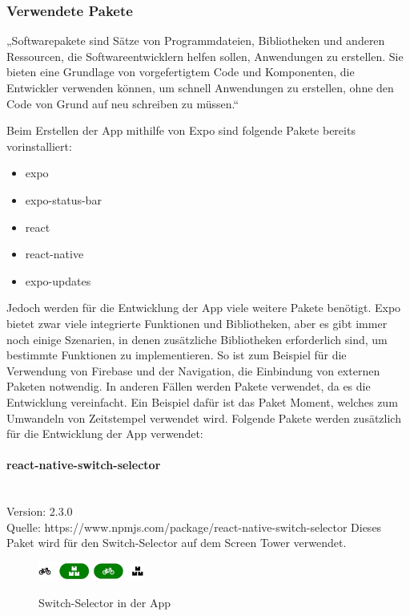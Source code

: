 \subsubsection{Verwendete Pakete}
„Softwarepakete sind Sätze von Programmdateien, Bibliotheken und anderen Ressourcen, die Softwareentwicklern helfen sollen, Anwendungen zu erstellen. Sie bieten eine Grundlage von vorgefertigtem Code und Komponenten, die Entwickler verwenden können, um schnell Anwendungen zu erstellen, ohne den Code von Grund auf neu schreiben zu müssen.“ 

\bigskip


Beim Erstellen der App mithilfe von Expo sind folgende Pakete bereits vorinstalliert:
\begin{itemize}
  \item expo
  \item expo-status-bar
  \item react
  \item react-native
  \item expo-updates
\end{itemize}

\noindent Jedoch werden für die Entwicklung der App viele weitere Pakete benötigt. Expo bietet zwar viele integrierte Funktionen und Bibliotheken, aber es gibt immer noch einige Szenarien, in denen zusätzliche Bibliotheken erforderlich sind, um bestimmte Funktionen zu implementieren.
\noindent So ist zum Beispiel für die Verwendung von Firebase und der Navigation, die Einbindung von externen Paketen notwendig.
\noindent In anderen Fällen werden Pakete verwendet, da es die Entwicklung vereinfacht. Ein Beispiel dafür ist das Paket Moment, welches zum Umwandeln von Zeitstempel verwendet wird.
\noindent Folgende Pakete werden zusätzlich für die Entwicklung der App verwendet:


\paragraph{react-native-switch-selector}\mbox{}\\
Version: 2.3.0\\ Quelle: https://www.npmjs.com/package/react-native-switch-selector
\bigskip
Dieses Paket wird für den Switch-Selector auf dem Screen Tower verwendet.
\begin{figure}[H]
  \centering
  \includegraphics[width=0.15\textwidth]{images/app-screenshots/switchselector.png}
  \includegraphics[width=0.15\textwidth]{images/app-screenshots/switchselector2.png}
  \caption{Switch-Selector in der App}
  \label{fig:switchselector}
\end{figure}

